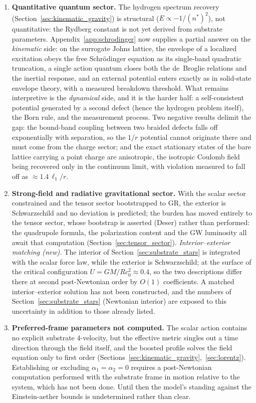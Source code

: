 \documentclass[11pt,a4paper]{article}
\theoremstyle{plain}
\theoremstyle{remark}
\begin{document}
\begin{enumerate}
    \item \textbf{Quantitative quantum sector.} The hydrogen spectrum recovery (Section~\ref{sec:kinematic_gravity}) is structural ($E \propto -1/(n^*)^2$), not quantitative: the Rydberg constant is not yet derived from substrate parameters. Appendix~\ref{app:schrodinger} now supplies a partial answer on the \emph{kinematic} side: on the surrogate Johns lattice, the envelope of a localized excitation obeys the free Schr\"odinger equation as its single-band quadratic truncation, a single action quantum closes both the de~Broglie relations and the inertial response, and an external potential enters exactly as in solid-state envelope theory, with a measured breakdown threshold. What remains interpretive is the \emph{dynamical} side, and it is the harder half: a self-consistent potential generated by a second defect (hence the hydrogen problem itself), the Born rule, and the measurement process. Two negative results delimit the gap: the bound-band coupling between two braided defects falls off exponentially with separation, so the $1/r$ potential cannot originate there and must come from the charge sector; and the exact stationary states of the bare lattice carrying a point charge are anisotropic, the isotropic Coulomb field being recovered only in the continuum limit, with violation measured to fall off as $\approx 1.4\,\ell_1/r$.
    \item \textbf{Strong-field and radiative gravitational sector.} With the scalar sector constrained and the tensor sector bootstrapped to GR, the exterior is Schwarzschild and no deviation is predicted; the burden has moved entirely to the tensor sector, whose bootstrap is asserted (Deser) rather than performed: the quadrupole formula, the polarization content and the GW luminosity all await that computation (Section~\ref{sec:tensor_sector}). \emph{Interior--exterior matching (new).} The interior of Section~\ref{sec:substrate_stars} is integrated with the scalar force law, while the exterior is Schwarzschild; at the surface of the critical configuration $U = GM/Rc_0^2 \approx 0.4$, so the two descriptions differ there at second post-Newtonian order by $O(1)$ coefficients. A matched interior--exterior solution has not been constructed, and the numbers of Section~\ref{sec:substrate_stars} (Newtonian interior) are exposed to this uncertainty in addition to those already listed.
    \item \textbf{Preferred-frame parameters not computed.} The scalar action contains no explicit substrate 4-velocity, but the effective metric singles out a time direction through the field itself, and the boosted profile solves the field equation only to first order (Sections~\ref{sec:kinematic_gravity},~\ref{sec:lorentz}). Establishing or excluding $\alpha_1 = \alpha_2 = 0$ requires a post-Newtonian computation performed with the substrate frame in motion relative to the system, which has not been done. Until then the model's standing against the Einstein-aether bounds is undetermined rather than clear.

\end{enumerate}
\end{document}
